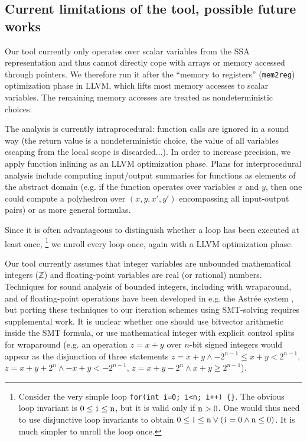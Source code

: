 \documentclass{entcs}
\newcommand{\ZZ}{\mathbb{Z}}
\begin{document}
\subsection{Current limitations of the tool, possible future works}

Our tool currently only operates over scalar variables from the SSA representation and thus cannot directly cope with arrays or memory accessed through pointers. We therefore run it after the ``memory to registers'' (\texttt{mem2reg}) optimization phase in LLVM, which lifts most memory accesses to scalar variables.
The remaining memory accesses are treated as nondeterministic choices.

The analysis is currently intraprocedural: function calls are ignored in a sound way (the return value is a nondeterministic choice, the value of all variables escaping from the local scope is discarded...).
In order to increase precision, we apply function inlining as an LLVM optimization phase.
Plans for interprocedural analysis include computing input/output summaries for functions as elements of the abstract domain (e.g. if the function operates over variables $x$ and $y$, then one could compute a polyhedron over $(x,y,x',y')$ encompassing all input-output pairs) or as more general formulas.

Since it is often advantageous to distinguish whether a loop has been executed at least once,%
\footnote{Consider the very simple loop \lstinline|for(int i=0; i<n; i++) {}|.
The obvious loop invariant is $0 \leq \lstinline|i| \leq \lstinline|n|$, but it is valid only if $\lstinline|n| > 0$.
One would thus need to use disjunctive loop invariants to obtain
$0 \leq \lstinline|i| \leq \lstinline|n| \lor
 (\lstinline|i|=0 \land \lstinline|n| \leq 0)$.
It is much simpler to unroll the loop once.}
we unroll every loop once, again with a LLVM optimization phase.

Our tool currently assumes that integer variables are unbounded mathematical integers ($\ZZ$) and floating-point variables are real (or rational) numbers. Techniques for sound analysis of bounded integers, including with wraparound, and of floating-point operations have been developed in e.g. the Astr\'ee system \citep{ASTREE_ESOP05,ASTREE_PLDI03}, but porting these techniques to our iteration schemes using SMT-solving requires supplemental work.
It is unclear whether one should use bitvector arithmetic inside the SMT formula, or use mathematical integer with explicit control splits for wraparound (e.g. an operation $z = x+y$ over $n$-bit signed integers would appear as the disjunction of three statements $z = x+y \land -2^{n-1} \leq x+y < 2^{n-1}$,
$z = x+y+2^n \land -x+y < -2^{n-1}$,
$z = x+y-2^n \land x+y \geq 2^{n-1}$).
\end{document}
